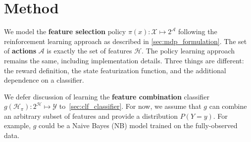 \section{Method}\label{sec:clf_method}

We model the \textbf{feature selection} policy $\pi(x): \mathcal{X} \mapsto 2^\mathcal{A}$ following the reinforcement learning approach as described in \autoref{sec:mdp_formulation}.
The set of \textbf{actions} $\mathcal{A}$ is exactly the set of features $\mathcal{H}$.
The policy learning approach remains the same, including implementation details.
Three things are different: the reward definition, the state featurization function, and the additional dependence on a classifier.

We defer discussion of learning the \textbf{feature combination} classifier $g(\mathcal{H}_\pi) : 2^\mathcal{H} \mapsto \mathcal{Y}$ to~\autoref{sec:clf_classifier}.
For now, we assume that $g$ can combine an arbitrary subset of features and provide a distribution $P(Y = y)$.
For example, $g$ could be a Naive Bayes (NB) model trained on the fully-observed data.






